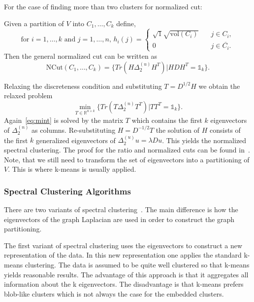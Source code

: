 For the case of finding more than two clusters for normalized cut:
\begin{lemma}
\label{lem:multincut}
Given a partition of $V$ into $C_1,\dots,C_k$ define,
\begin{equation}
\label{eq:fmultincut}
\text{for $i = 1,\dots,k$ and $j=1,\dots,n$, }
 h_i(j) = \begin{cases} 
                      \sqrt{1}{\sqrt{\mathrm{vol}(C_i)}}   & \quad j \in C_i, \\
                      0 & \quad j \in \overline{C_i}.
                     \end{cases}
\end{equation}
Then the general normalized cut can be written as
\begin{equation*}
\mathrm{NCut}(C_1,\dots,C_k) = \{Tr(H\Delta_{2}^{(u)}H^T) |HDH^T = \mathds{1}_k\}.
\end{equation*}
\end{lemma}
Relaxing the discreteness condition and substituting $T = D^{1/2}H$ we obtain the relaxed problem
\begin{equation}
\label{eq:mint}
\min\limits_{T \in \mathbb{R}^{n\times k}} \{Tr(T\Delta_{2}^{(n)}T^T) |TT^T = \mathds{1}_k\}.
\end{equation}
Again~\eqref{eq:mint} is solved by the matrix $T$ which contains the first $k$ eigenvectors of $\Delta_{2}^{(n)}$ as columns. Re-substituting $H = D^{-1/2}T$ the solution of $H$ consists of the first $k$ generalized eigenvectors
of $\Delta_{2}^{(u)}u= \lambda Du$. This yields the normalized spectral clustering.
The proof for the ratio and normalized cuts can be found in~\cite{Luxb07}. 
Note, that we still need to transform the set of eigenvectors into a partitioning of $V$. This is where k-means is usually applied.
\subsubsection*{Spectral Clustering Algorithms}
There are two variants of spectral clustering~\cite{HeinNotes}. The main difference is how the eigenvectors of the graph Laplacian are used in order to construct the graph partitioning.

The first variant of spectral clustering uses the eigenvectors to construct a new representation of the data. In this new representation one applies the standard k-means clustering. The data is assumed to be quite well clustered 
so that k-means yields reasonable results. The advantage of this approach is that it aggregates all information about the k eigenvectors. 
The disadvantage is that k-means prefers blob-like clusters which is not always the case for the embedded clusters.

